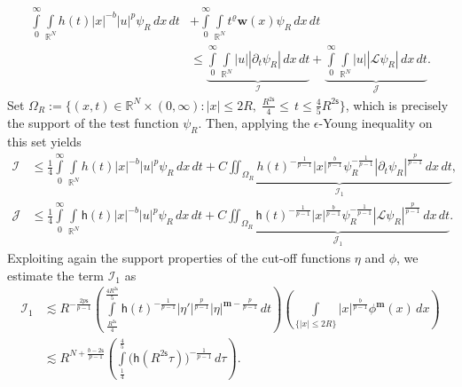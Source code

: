 \documentclass[12pt,reqno]{amsart}
\theoremstyle{plain}
\theoremstyle{definition}
\theoremstyle{remark}
\numberwithin{equation}{section}
\newcommand{\h}{\mathsf h}
\newcommand{\ci}{\mathcal{I}}
\newcommand{\cj}{\mathcal{J}}
\newcommand{\ts}{\mathsf{s}}
\newcommand{\bm}{\mathbf{m}}
\begin{document}
\begin{enumerate}[label=(\roman*)]
\begin{equation}
\label{W-S-1}
\begin{split}
\int\limits_0^\infty \int\limits_{\mathbb{R}^N} h(t) |x|^{-b} |u|^p \psi_R \, dx \, dt &+ \int\limits_0^\infty \int\limits_{\mathbb{R}^N} t^\varrho \mathbf{w}(x) \psi_R \, dx \, dt \\
&\leq \underbrace{\int\limits_0^\infty \int\limits_{\mathbb{R}^N} |u| |\partial_t \psi_{R}| \, dx \, dt}_{\ci} + \underbrace{\int\limits_0^\infty \int\limits_{\mathbb{R}^N} |u| |\mathscr{L} \psi_{R}| \, dx \, dt}_{\cj}.
\end{split}
\end{equation}
Set $\Omega_R := \{ (x,t) \in \mathbb{R}^N \times (0,\infty) : |x| \leq 2R,\; \frac{R^{2\ts}}{4}\leq\,t \leq \frac{4}{5}R^{2\ts} \}$, which is precisely the support of the test function $\psi_R$. Then, applying the $\epsilon$-Young inequality on this set yields
\begin{align}
    \label{Forc1}
    \ci &\leq \frac{1}{4} \int\limits_0^\infty \int\limits_{\mathbb{R}^N} h(t) |x|^{-b} |u|^p \psi_{R} \, dx \, dt + C \underbrace{ \iint_{\Omega_R} h(t)^{-\frac{1}{p-1}} |x|^{\frac{b}{p-1}} \psi_{R}^{-\frac{1}{p-1}} |\partial_t \psi_{R}|^{\frac{p}{p-1}} \, dx \, dt}_{\ci_1}, \\
    \label{Forc2}
    \cj &\leq \frac{1}{4} \int\limits_0^\infty \int\limits_{\mathbb{R}^N} \h(t) |x|^{-b} |u|^p \psi_{R} \, dx \, dt + C \underbrace{ \iint_{\Omega_R} \h(t)^{-\frac{1}{p-1}} |x|^{\frac{b}{p-1}} \psi_{R}^{-\frac{1}{p-1}} |\mathscr{L} \psi_{R}|^{\frac{p}{p-1}} \, dx \, dt}_{\cj_1}.
\end{align}
Exploiting again the support properties of the cut-off functions $\eta$ and $\phi$, we estimate the term $\ci_1$ as
\begin{equation}
    \label{Forc3}
    \begin{split}
        \ci_1 &\lesssim R^{-\frac{2p\ts}{p-1}}
        \left( \int\limits_{\frac{R^{2\ts}}{4}}^{\frac{4R^{2\ts}}{5}}
            \h(t)^{-\frac{1}{p-1}}
            |\eta'|^{\frac{p}{p-1}}
            |\eta|^{\bm - \frac{p}{p-1}} \, dt \right)
        \left( \int\limits_{\{|x|\leq 2R\}}
            |x|^{\frac{b}{p-1}} \phi^{\bm}(x) \, dx \right) \\
        &\lesssim R^{N+\frac{b-2\ts}{p-1}}
        \left( \int\limits_{\frac{1}{4}}^{\frac{4}{5}}
            \Big( \h(R^{2\ts}\tau) \Big)^{-\frac{1}{p-1}} \, d\tau \right).
    \end{split}
\end{equation}

\end{enumerate}
\end{document}
